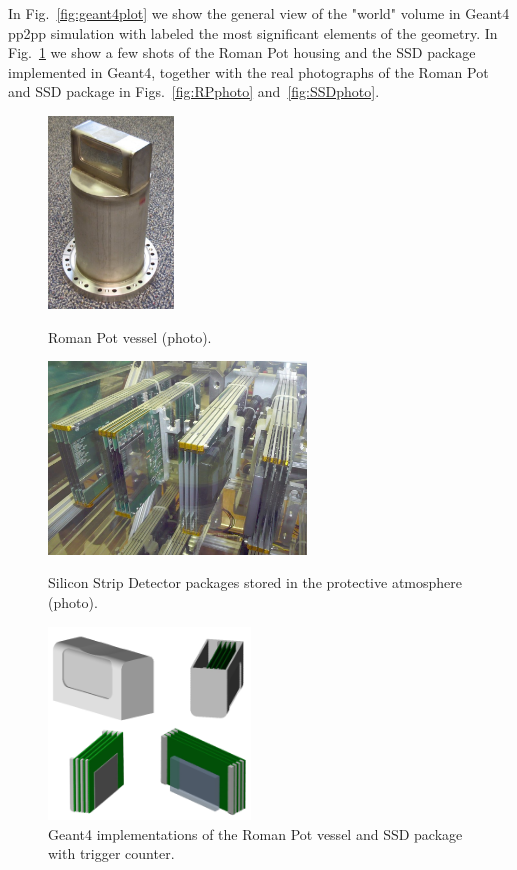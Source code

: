 In Fig.~\ref{fig:geant4plot} we show the general view of the "world" volume in Geant4 pp2pp simulation with labeled the most significant elements of the geometry. In Fig.~\ref{fig:g4Rp} we show a few shots of the Roman Pot housing and the SSD package implemented in Geant4, together with the real photographs of the Roman Pot and SSD package in Figs.~\ref{fig:RPphoto} and~\ref{fig:SSDphoto}.

\begin{figure}[h]
	\centering
	\parbox{0.2\textwidth}{
		\centering
		\includegraphics[height=145pt]{graphics/rpSim/romanpot.jpg}
		\caption[Roman Pot vessel (photo).]{Roman Pot vessel (photo).\newline}
		\label{fig:RPphoto}
	}%
	\quad%
	\parbox{0.40\textwidth}{
		\centering
		\includegraphics[height=145pt]{graphics/rpSim/SSD.jpg}
		\caption[Silicon Strip Detector packages stored in the protective atmosphere (photo).]{Silicon Strip Detector packages stored in the protective atmosphere (photo).\newline}
		\label{fig:SSDphoto}
	}%
	\quad%
	\parbox{0.33\textwidth}{
		\centering
		\includegraphics[height=145pt]{graphics/rpSim/g4Rp.png}
		\caption{Geant4 implementations of the Roman Pot vessel and SSD package with trigger counter.}
		\label{fig:g4Rp}
	}
\end{figure}\vspace{-15pt}

